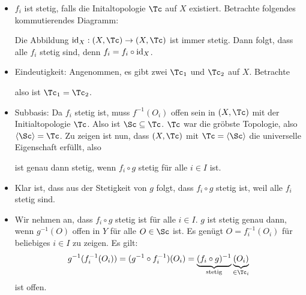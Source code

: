 \begin{beweis}
\begin{itemize}
\item $f_i$ ist stetig, falls die Initaltopologie $\Tc$ auf $X$ existiert. Betrachte folgendes kommutierendes Diagramm:
\begin{center}
\end{center}
Die Abbildung $\id_X: (X,\Tc) \to (X, \Tc)$ ist immer stetig. Dann folgt, dass alle $f_i$ stetig sind, denn $f_i = f_i \circ \text{id}_X$.
\item Eindeutigkeit: Angenommen, es gibt zwei $\Tc_1$ und $\Tc_2$ auf $X$. Betrachte
\begin{center}
\end{center}
also ist $\Tc_1 = \Tc_2$.
\item Subbasis: Da $f_i$ stetig ist, muss $f^{-1}(O_i)$ offen sein in $(X, \Tc)$ mit der Initialtopologie $\Tc$. Also ist $\Sc \sub \Tc$. $\Tc$ war die gröbste Topologie, also $\langle \Sc \rangle = \Tc$. Zu zeigen ist nun, dass $(X,\Tc)$ mit $\Tc = \langle \Sc \rangle$ die universelle Eigenschaft erfüllt, also 
\begin{center}
\end{center}
ist genau dann stetig, wenn $f_i \circ g$ stetig für alle $i \in I$ ist.
\item Klar ist, dass aus der Stetigkeit von $g$ folgt, dass $f_i \circ g$ stetig ist, weil alle $f_i$ stetig sind. 
\item Wir nehmen an, dass $f_i \circ g$ stetig ist für alle $i \in I$. $g$ ist stetig genau dann, wenn $g^{-1}(O)$ offen in $Y$ für  alle $O \in \Sc$ ist. Es genügt $O=f_i^{-1}(O_i)$ für beliebiges $i \in I$ zu zeigen. Es gilt:
\begin{equation}
g^{-1}(f_i^{-1}(O_i)) = (g^{-1} \circ f_i^{-1})(O_i) = \underbrace{(f_i \circ g)^{-1}}_\text{stetig} \underbrace{(O_i)}_{\in \Tc_i}
\end{equation}
ist offen.
\end{itemize}
\end{beweis}
